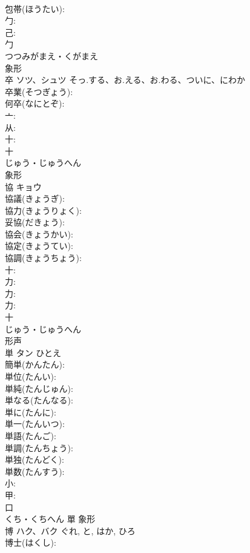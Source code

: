 \documentclass[8pt]{extreport}
\begin{document}
\begin{CJK}{UTF8}{min}
\\	包帯(ほうたい): 
\\	勹: 
\\	己: 
\\	勹	
\\	つつみがまえ・くがまえ	
\\	象形 
\\	卒	ソツ、シュツ	そっ.する、お.える、お.わる、ついに、にわか		
\\	卒業(そつぎょう): 
\\	何卒(なにとぞ): 
\\	亠: 
\\	从: 
\\	十: 
\\	十	
\\	じゅう・じゅうへん	
\\	象形 
\\	協	キョウ			
\\	協議(きょうぎ): 
\\	協力(きょうりょく): 
\\	妥協(だきょう): 
\\	協会(きょうかい): 
\\	協定(きょうてい): 
\\	協調(きょうちょう): 
\\	十: 
\\	力: 
\\	力: 
\\	力: 
\\	十	
\\	じゅう・じゅうへん	
\\	形声 
\\	単	タン	ひとえ		
\\	簡単(かんたん): 
\\	単位(たんい): 
\\	単純(たんじゅん): 
\\	単なる(たんなる): 
\\	単に(たんに): 
\\	単一(たんいつ): 
\\	単語(たんご): 
\\	単調(たんちょう): 
\\	単独(たんどく): 
\\	単数(たんすう): 
\\	小: 
\\	甲: 
\\	口	
\\	くち・くちへん	單	象形 
\\	博	ハク、バク		ぐれ, と, はか, ひろ	
\\	博士(はくし): 

\end{CJK}
\end{document}
